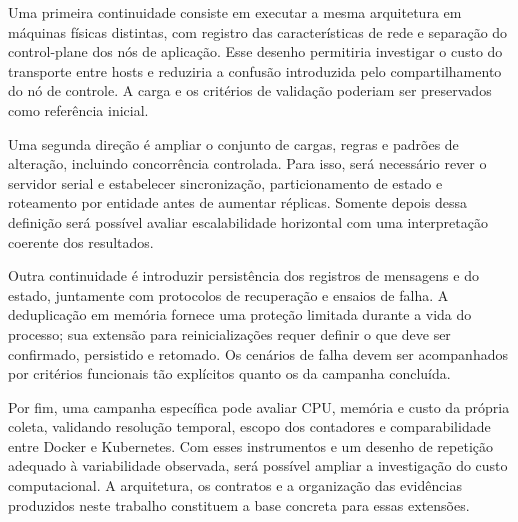 Uma primeira continuidade consiste em executar a mesma arquitetura em máquinas físicas distintas, com registro das características de rede e separação do control-plane dos nós de aplicação. Esse desenho permitiria investigar o custo do transporte entre hosts e reduziria a confusão introduzida pelo compartilhamento do nó de controle. A carga e os critérios de validação poderiam ser preservados como referência inicial.

Uma segunda direção é ampliar o conjunto de cargas, regras e padrões de alteração, incluindo concorrência controlada. Para isso, será necessário rever o servidor serial e estabelecer sincronização, particionamento de estado e roteamento por entidade antes de aumentar réplicas. Somente depois dessa definição será possível avaliar escalabilidade horizontal com uma interpretação coerente dos resultados.

Outra continuidade é introduzir persistência dos registros de mensagens e do estado, juntamente com protocolos de recuperação e ensaios de falha. A deduplicação em memória fornece uma proteção limitada durante a vida do processo; sua extensão para reinicializações requer definir o que deve ser confirmado, persistido e retomado. Os cenários de falha devem ser acompanhados por critérios funcionais tão explícitos quanto os da campanha concluída.

Por fim, uma campanha específica pode avaliar CPU, memória e custo da própria coleta, validando resolução temporal, escopo dos contadores e comparabilidade entre Docker e Kubernetes. Com esses instrumentos e um desenho de repetição adequado à variabilidade observada, será possível ampliar a investigação do custo computacional. A arquitetura, os contratos e a organização das evidências produzidos neste trabalho constituem a base concreta para essas extensões.
